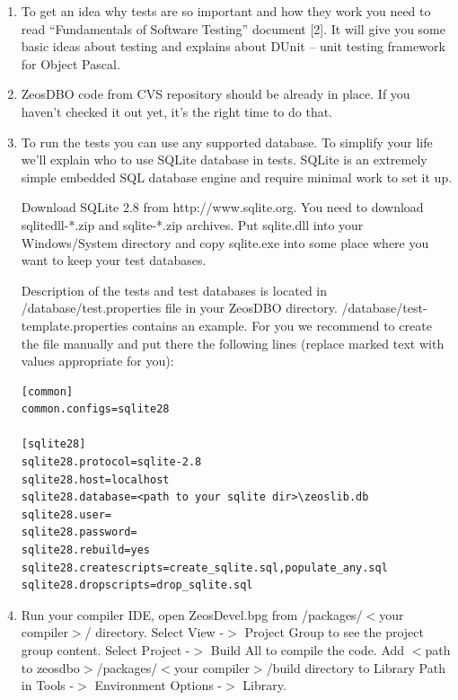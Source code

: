 \documentclass[a4paper,12pt,oneside]{book}
\begin{document}
\begin{enumerate}
  \item
	  To get an idea why tests are so important and how they work you need to read “Fundamentals of Software Testing” document [2].
		It will give you some basic ideas about testing and explains about DUnit – unit testing framework for Object Pascal.
	\item
	  ZeosDBO code from CVS repository should be already in place. If you haven’t checked it out yet, it’s the right time to do that.
	\item
	  To run the tests you can use any supported database.
		To simplify your life we’ll explain who to use SQLite database in tests.
		SQLite is an extremely simple embedded SQL database engine and require minimal work to set it up.

    Download SQLite 2.8 from http://www.sqlite.org.
    You need to download sqlitedll-*.zip and sqlite-*.zip archives.
    Put sqlite.dll into your Windows/System directory and copy sqlite.exe into some place where you want to keep your test databases.

    Description of the tests and test databases is located in /database/test.properties file in your ZeosDBO directory.
    /database/test-template.properties contains an example.
    For you we recommend to create the file manually and put there the following lines (replace marked text with values appropriate for you):

\begin{verbatim}
[common]
common.configs=sqlite28

[sqlite28]
sqlite28.protocol=sqlite-2.8
sqlite28.host=localhost
sqlite28.database=<path to your sqlite dir>\zeoslib.db
sqlite28.user=
sqlite28.password=
sqlite28.rebuild=yes
sqlite28.createscripts=create_sqlite.sql,populate_any.sql
sqlite28.dropscripts=drop_sqlite.sql
\end{verbatim}

  \item
	  Run your compiler IDE, open ZeosDevel.bpg from /packages/$<$your compiler$>$/ directory. 
		Select View -$>$ Project Group to see the project group content.
		Select Project -$>$ Build All to compile the code.
		Add $<$path to zeosdbo$>$/packages/$<$your compiler$>$/build directory to Library Path in Tools -$>$ Environment Options -$>$ Library.


\end{enumerate}
\end{document}
